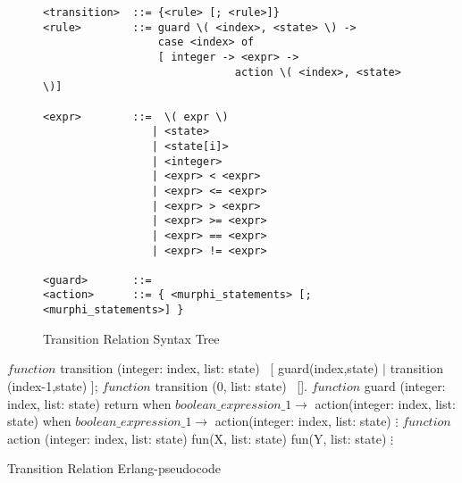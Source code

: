 \begin{figure}
\begin{verbatim} 
<transition>  ::= {<rule> [; <rule>]}
<rule>        ::= guard \( <index>, <state> \) ->
                  case <index> of  
                  [ integer -> <expr> -> 
                              action \( <index>, <state> \)]

<expr>        ::=  \( expr \)
	             | <state>
	             | <state[i]>
	             | <integer>
	             | <expr> < <expr>
	             | <expr> <= <expr>
	             | <expr> > <expr>
	             | <expr> >= <expr>
	             | <expr> == <expr>
	             | <expr> != <expr>

<guard>       ::=
<action>      ::= { <murphi_statements> [; <murphi_statements>] }
\end{verbatim}
\caption{Transition Relation Syntax Tree}
\label{TRst}
\end{figure}

\begin{algorithm}
\begin{algorithmic}
\STATE $function$ transition (integer: index, list: state)
\STATE \ [ guard(index,state) $|$ transition (index-1,state) ];
\newline
\STATE $function$ transition (0, list: state)
\STATE \ [].
\newline
\STATE $function$ guard (integer: index, list: state)
\STATE return
\STATE when $boolean\_expression\_1 \rightarrow$ action(integer: index, list: state)
\STATE when $boolean\_expression\_1 \rightarrow$ action(integer: index, list: state)
\STATE $\vdots$
\ENDIF
\newline
\STATE $function$ action (integer: index, list: state)
\STATE fun(X, list: state)
\STATE fun(Y, list: state)
\STATE $\vdots$
\ENDIF


\caption{Transition Relation Erlang-pseudocode}
\label{TRerl}
\end{algorithmic}
\end{algorithm}



